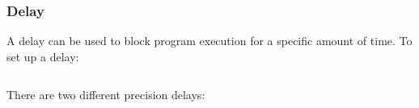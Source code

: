 \documentclass{beamer}
\begin{document}
\begin{frame}
  \frametitle{Delay}
  A delay can be used to block program execution for a specific amount of time. To set up a delay:
  \begin{columns}[t]
    \begin{column}{.5\linewidth}
      
    \end{column}
    \begin{column}{.5\linewidth}
      
    \end{column}
  \end{columns}

  There are two different precision delays:
  
  
\end{frame}
\end{document}
